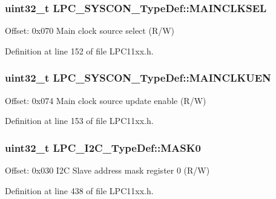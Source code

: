 \subsubsection[{\texorpdfstring{M\+A\+I\+N\+C\+L\+K\+S\+EL}{MAINCLKSEL}}]{ uint32\+\_\+t L\+P\+C\+\_\+\+S\+Y\+S\+C\+O\+N\+\_\+\+Type\+Def\+::\+M\+A\+I\+N\+C\+L\+K\+S\+EL}\hypertarget{group___l_p_c11xx___definitions_gac54af00088fc697ce0954b04ec4786c8}{}\label{group___l_p_c11xx___definitions_gac54af00088fc697ce0954b04ec4786c8}
Offset\+: 0x070 Main clock source select (R/W) 

Definition at line 152 of file L\+P\+C11xx.\+h.

\subsubsection[{\texorpdfstring{M\+A\+I\+N\+C\+L\+K\+U\+EN}{MAINCLKUEN}}]{ uint32\+\_\+t L\+P\+C\+\_\+\+S\+Y\+S\+C\+O\+N\+\_\+\+Type\+Def\+::\+M\+A\+I\+N\+C\+L\+K\+U\+EN}\hypertarget{group___l_p_c11xx___definitions_ga37489ea97331f7e125153289ab06b236}{}\label{group___l_p_c11xx___definitions_ga37489ea97331f7e125153289ab06b236}
Offset\+: 0x074 Main clock source update enable (R/W) 

Definition at line 153 of file L\+P\+C11xx.\+h.

\subsubsection[{\texorpdfstring{M\+A\+S\+K0}{MASK0}}]{ uint32\+\_\+t L\+P\+C\+\_\+\+I2\+C\+\_\+\+Type\+Def\+::\+M\+A\+S\+K0}\hypertarget{group___l_p_c11xx___definitions_ga2dbe9cd48d1a0b7efa8175a9b66c1af4}{}\label{group___l_p_c11xx___definitions_ga2dbe9cd48d1a0b7efa8175a9b66c1af4}
Offset\+: 0x030 I2C Slave address mask register 0 (R/W) 

Definition at line 438 of file L\+P\+C11xx.\+h.


